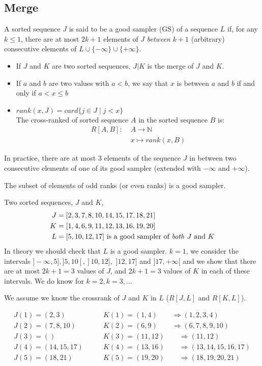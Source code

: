 \subsection{Merge}
\begin{defi}
A sorted sequence $J$ is said to be a good sampler (GS) of a sequence $L$ if, for any $k \leq 1$, there are at most $2k+1$ elements of $J$ \emph{between} $k+1$ (arbitrary) consecutive elements of $L \cup \{-\infty \} \cup \{+\infty\}$.

\begin{itemize}
\item If $J$ and $K$ are two sorted sequences, $J|K$ is the merge of $J$ and $K$.
\item If $a$ and $b$ are two values with $a<b$, we say that $x$ is between $a$ and $b$ if and only if $a<x\leq b$
\item $rank(x,J)=card \{j\in J \;|\; j<x \}$\\
The cross-ranked of sorted sequence $A$ in the sorted sequence $B$ is:
\begin{align*}
R[A,B]: \; & A\to \mathbb{N}\\
& x\mapsto rank(x,B)
\end{align*}
\end{itemize}
\end{defi}
In practice, there are at most 3 elements of the sequence $J$ in between two consecutive elements of one of its good sampler (extended with $-\infty$ and $+\infty$).

 The subset of elements of odd ranks (or even ranks) is a good sampler.


Two sorted sequences, $J$ and $K$, 
\begin{align*}
J & =[2,3,7,8,10,14,15,17,18,21]\\
K & = [1,4,6,9,11,12,13,16,19,20]\\
L & = [5,10,12,17] \text{ is a good sampler of \emph{both} $J$ and $K$}
\end{align*}
In theory we should check that $L$ is a good sampler. $k=1$, we consider the intervals $]-\infty ,5], ]5,10[, ]10,12],$ $]12,17]$ and $]17,+\infty [$ and we show that there are at most $2k+1=3$ values of $J$, and $2k+1=3$ values of $K$ in each of these intervals.
We do know for $k=2, k=3,...$

We assume we know the crossrank of $J$ and $K$ in $L$ ($R[J,L]$ and $R[K,L]$).

\begin{align*}
J(1) = (2,3) & \qquad K(1)=(1,4) \qquad\Rightarrow (1,2,3,4) \\
J(2)=(7,8,10) & \qquad K(2)=(6,9) \qquad\Rightarrow (6,7,8,9,10)\\
J(3)=() & \qquad K(3)=(11,12) \qquad\Rightarrow (11,12)\\
J(4)=(14,15,17) & \qquad K(4)=(13,16) \qquad\Rightarrow (13,14,15,16,17)\\
J(5)=(18,21) & \qquad K(5)=(19,20) \qquad\Rightarrow (18,19,20,21)\\
\end{align*}

